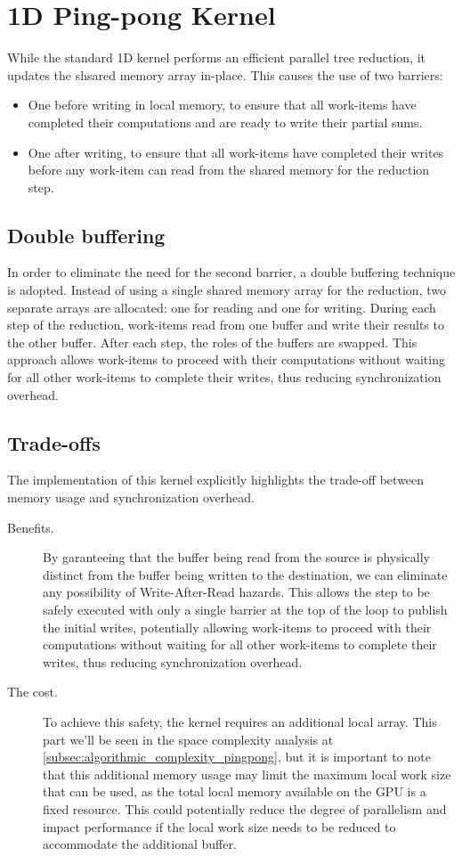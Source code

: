 \section{1D Ping-pong Kernel}\label{sec:1d_ping_pong_kernel}
While the standard 1D kernel performs an efficient parallel tree reduction, it updates the shsared memory array in-place. This causes the use of two barriers:
\begin{itemize}
    \item One before writing in local memory, to ensure that all work-items have completed their computations and are ready to write their partial sums.
    \item One after writing, to ensure that all work-items have completed their writes before any work-item can read from the shared memory for the reduction step.
\end{itemize}

\subsection{Double buffering}\label{subsec:double_buffering}
In order to eliminate the need for the second barrier, a double buffering technique is adopted. Instead of using a single shared memory array for the reduction, two separate arrays are allocated: one for reading and one for writing. During each step of the reduction, work-items read from one buffer and write their results to the other buffer. After each step, the roles of the buffers are swapped. This approach allows work-items to proceed with their computations without waiting for all other work-items to complete their writes, thus reducing synchronization overhead.

\subsection{Trade-offs}\label{subsec:trade_offs}
The implementation of this kernel explicitly highlights the trade-off between memory usage and synchronization overhead.
\begin{description}
    \item[Benefits.] By garanteeing that the buffer being read from the source is physically distinct from the buffer being written to the destination, we can eliminate any possibility of Write-After-Read hazards. This allows the step to be safely executed with only a single barrier at the top of the loop to publish the initial writes, potentially allowing work-items to proceed with their computations without waiting for all other work-items to complete their writes, thus reducing synchronization overhead.
    \item[The cost.] To achieve this safety, the kernel requires an additional local array. This part we'll be seen in the space complexity analysis at \ref{subsec:algorithmic_complexity_pingpong}, but it is important to note that this additional memory usage may limit the maximum local work size that can be used, as the total local memory available on the GPU is a fixed resource. This could potentially reduce the degree of parallelism and impact performance if the local work size needs to be reduced to accommodate the additional buffer.  
\end{description}

